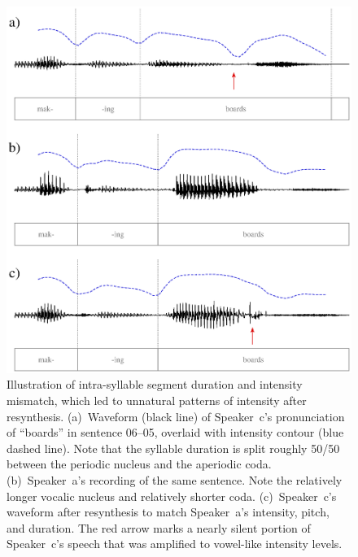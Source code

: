 \begin{figure}
	\begin{centering}
	\includegraphics{figures/segmentMismatch/segmentMismatch.eps}
	\caption[Segment duration mismatch in resynthesis]{Illustration of intra-syllable segment duration and intensity mismatch, which led to unnatural patterns of intensity after resynthesis.  (a)~Waveform (black line) of Speaker~\ac{c}’s pronunciation of “boards” in sentence 06–05, overlaid with intensity contour (blue dashed line).  Note that the syllable duration is split roughly 50/50 between the periodic nucleus and the aperiodic coda.  (b)~Speaker~\ac{a}’s recording of the same sentence.  Note the relatively longer vocalic nucleus and relatively shorter coda.  (c)~Speaker~\ac{c}’s waveform after resynthesis to match Speaker~\ac{a}’s intensity, pitch, and duration.  The red arrow marks a nearly silent portion of Speaker~\ac{c}’s speech that was amplified to vowel-like intensity levels.\label{fig:SegDurMismatch}}
	\end{centering}
\end{figure}

